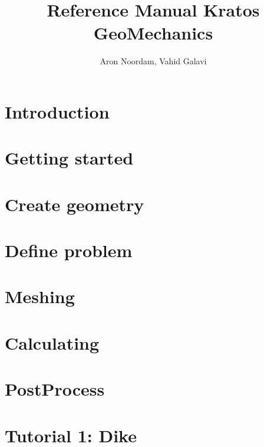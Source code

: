 \documentclass{deltares_manual}
\begin{document}
	
	
\title{Reference Manual Kratos GeoMechanics}
\subtitle{}


\manualtype{}

\author{Aron Noordam, Vahid Galavi}
\deltarestitle

\chapter{Introduction}



\chapter{Getting started}


\chapter{Create geometry}


\chapter{Define problem}


\chapter{Meshing}


\chapter{Calculating}


\chapter{PostProcess}



\chapter{Tutorial 1: Dike}



\end{document}
